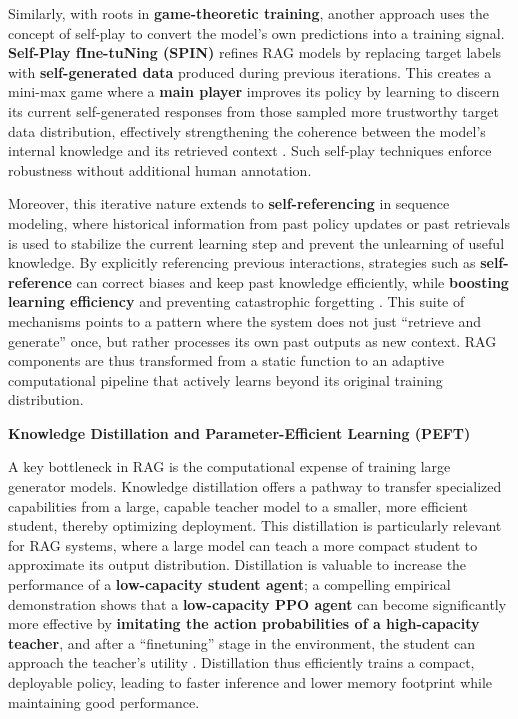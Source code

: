 \documentclass[11pt]{article}
\begin{document}
Similarly, with roots in \textbf{game-theoretic training}, another approach uses the concept of self-play to convert the model's own predictions into a training signal. \textbf{Self-Play fIne-tuNing (SPIN)} refines RAG models by replacing target labels with \textbf{self-generated data} produced during previous iterations. This creates a mini-max game where a \textbf{main player} improves its policy by learning to discern its current self-generated responses from those sampled more trustworthy target data distribution, effectively strengthening the coherence between the model's internal knowledge and its retrieved context \cite{ref232}. Such self-play techniques enforce robustness without additional human annotation.

Moreover, this iterative nature extends to \textbf{self-referencing} in sequence modeling, where historical information from past policy updates or past retrievals is used to stabilize the current learning step and prevent the unlearning of useful knowledge. By explicitly referencing previous interactions, strategies such as \textbf{self-reference} can correct biases and keep past knowledge efficiently, while \textbf{boosting learning efficiency} and preventing catastrophic forgetting \cite{ref233}. This suite of mechanisms points to a pattern where the system does not just ``retrieve and generate'' once, but rather processes its own past outputs as new context. RAG components are thus transformed from a static function to an adaptive computational pipeline that actively learns beyond its original training distribution.

\textbf{Knowledge Distillation and Parameter-Efficient Learning (PEFT)}

A key bottleneck in RAG is the computational expense of training large generator models. Knowledge distillation offers a pathway to transfer specialized capabilities from a large, capable teacher model to a smaller, more efficient student, thereby optimizing deployment. This distillation is particularly relevant for RAG systems, where a large model can teach a more compact student to approximate its output distribution. Distillation is valuable to increase the performance of a \textbf{low-capacity student agent}; a compelling empirical demonstration shows that a \textbf{low-capacity PPO agent} can become significantly more effective by \textbf{imitating the action probabilities of a high-capacity teacher}, and after a ``finetuning'' stage in the environment, the student can approach the teacher's utility \cite{ref234}. Distillation thus efficiently trains a compact, deployable policy, leading to faster inference and lower memory footprint while maintaining good performance.
\end{document}
